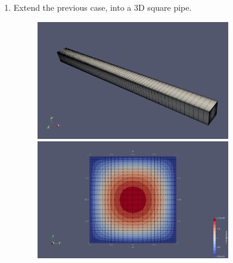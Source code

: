 \documentclass{article}
\begin{document}
\begin{enumerate}[label=1.\arabic*]
	\newpage
 	\item Extend the previous case, into a 3D square pipe.
 	
	\begin{figure}[h]
		\centering
 		\includegraphics[width=0.8\textwidth]{3D_mesh2.png}
 		\includegraphics[width=0.8\textwidth]{3D_velocity.png}
	\end{figure}

	
\end{enumerate}
	
\end{document}

